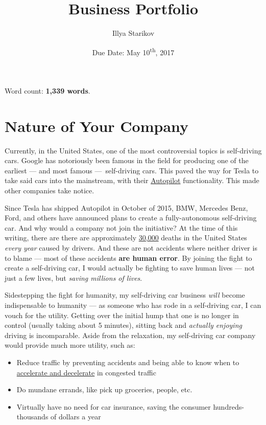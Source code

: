 \documentclass[12pt]{article}
\title{Business Portfolio}
\date{Due Date: May 10\textsuperscript{th}, 2017}
\author{Illya Starikov}
\begin{document}
\maketitle


Word count: \textbf{1,339 words}.

\section{Nature of Your Company}\label{component-1-nature-of-your-company}

Currently, in the United States, one of the most controversial topics is self-driving cars. Google has notoriously been famous in the field for producing one of the earliest --- and most famous ---~self-driving cars. This paved the way for Tesla to take said cars into the mainstream, with their \href{https://www.tesla.com/autopilot}{Autopilot} functionality. This made other companies take notice.

Since Tesla has shipped Autopilot in October of 2015, BMW, Mercedes Benz, Ford, and others have announced plans to create a fully-autonomous self-driving car. And why would a company not join the initiative? At the time of this writing, there are there are approximately \href{https://www-fars.nhtsa.dot.gov/Main/index.aspx}{30,000} deaths in the United States \emph{every year} caused by drivers. And these are not accidents where neither driver is to blame --- most of these accidents \textbf{are human error}. By joining the fight to create a self-driving car, I would actually be fighting to save human lives --- not just a few lives, but \emph{saving millions of lives}.

Sidestepping the fight for humanity, my self-driving car business \emph{will} become indispensable to humanity --- as someone who has rode in a self-driving car, I can vouch for the utility. Getting over the initial hump that one is no longer in control (usually taking about 5 minutes), sitting back and \emph{actually enjoying} driving is incomparable. Aside from the relaxation, my self-driving car company would provide much more utility, such as:

\begin{itemize}
    \item Reduce traffic by preventing accidents and being able to know when to \href{https://www.youtube.com/watch?v=iHzzSao6ypE}{accelerate and decelerate} in congested traffic
    \item Do mundane errands, like pick up groceries, people, etc.
    \item Virtually have no need for car insurance, saving the consumer hundreds-thousands of dollars a year
\end{itemize}
\end{document}
